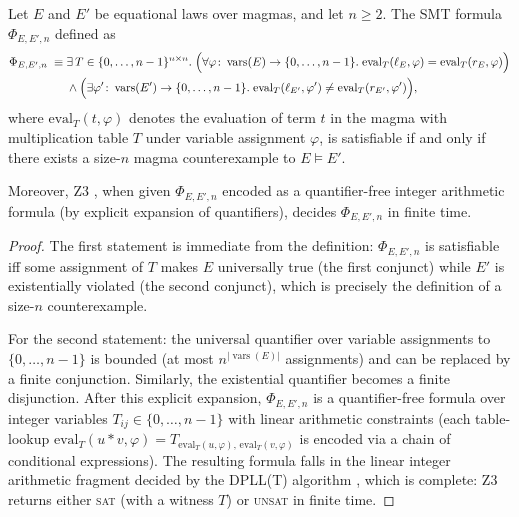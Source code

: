 \begin{theorem}\label{thm:z3-complete}
Let $E$ and $E'$ be equational laws over magmas, and let $n \geq 2$.  The SMT
formula $\Phi_{E,E',n}$ defined as
\begin{align}
  \Phi_{E,E',n} \;\equiv\; &
  \exists\, T \in \{0,\ldots,n-1\}^{n \times n}.\;
  \Bigl(
    \forall \varphi \colon \operatorname{vars}(E) \to \{0,\ldots,n-1\}.\;
    \mathrm{eval}_T(\ell_E, \varphi) = \mathrm{eval}_T(r_E, \varphi)
  \Bigr) \nonumber \\
  & \wedge
  \Bigl(
    \exists \varphi' \colon \operatorname{vars}(E') \to \{0,\ldots,n-1\}.\;
    \mathrm{eval}_T(\ell_{E'}, \varphi') \neq \mathrm{eval}_T(r_{E'}, \varphi')
  \Bigr),
  \label{eq:smt}
\end{align}
where $\mathrm{eval}_T(t, \varphi)$ denotes the evaluation of term $t$ in the magma
with multiplication table $T$ under variable assignment $\varphi$, is satisfiable if
and only if there exists a size-$n$ magma counterexample to $E \models E'$.

Moreover, Z3 \cite{demoura2008z3}, when given $\Phi_{E,E',n}$ encoded as a quantifier-free
integer arithmetic formula (by explicit expansion of quantifiers), decides $\Phi_{E,E',n}$
in finite time.
\end{theorem}

\begin{proof}
The first statement is immediate from the definition: $\Phi_{E,E',n}$ is satisfiable
iff some assignment of $T$ makes $E$ universally true (the first conjunct) while $E'$
is existentially violated (the second conjunct), which is precisely the definition of
a size-$n$ counterexample.

For the second statement: the universal quantifier over variable assignments to
$\{0,\ldots,n-1\}$ is bounded (at most $n^{|\operatorname{vars}(E)|}$ assignments) and can be
replaced by a finite conjunction.  Similarly, the existential quantifier becomes a
finite disjunction.  After this explicit expansion, $\Phi_{E,E',n}$ is a quantifier-free
formula over integer variables $T_{ij} \in \{0,\ldots,n-1\}$ with linear arithmetic
constraints (each table-lookup $\mathrm{eval}_T(u*v, \varphi) = T_{\mathrm{eval}_T(u,\varphi),\,\mathrm{eval}_T(v,\varphi)}$
is encoded via a chain of conditional expressions).  The resulting formula falls in the
linear integer arithmetic fragment decided by the DPLL(T) algorithm \cite{demoura2008z3},
which is complete: Z3 returns either \textsc{sat} (with a witness $T$) or \textsc{unsat}
in finite time.
\end{proof}

